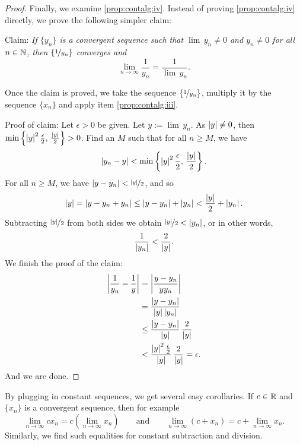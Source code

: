 \begin{proof}
Finally, we examine
\ref{prop:contalg:iv}.  Instead of proving 
\ref{prop:contalg:iv} directly, we prove the following simpler claim:

Claim: \emph{If $\{ y_n \}$ is a convergent sequence such that
$\lim\, y_n \not= 0$ and $y_n \not= 0$ for all $n \in {\mathbb{N}}$, then
$\{ \nicefrac{1}{y_n} \}$ converges and}
\begin{equation*}
\lim_{n\to\infty} \frac{1}{y_n} = \frac{1}{\lim\, y_n}  .
\end{equation*}

Once the claim is proved, we take the sequence $\{ \nicefrac{1}{y_n} \}$,
multiply it by the sequence $\{ x_n \}$ and apply item
\ref{prop:contalg:iii}.

Proof of claim:  Let $\epsilon > 0$ be given.
Let $y := \lim\, y_n$.
As $\left\lvert {y} \right\rvert \not= 0$, then
$\min \left\{ \left\lvert {y} \right\rvert^2\frac{\epsilon}{2}, \, \frac{\left\lvert {y} \right\rvert}{2} \right\} > 0$.
Find an $M$ such that for all $n \geq M$,
we have
\begin{equation*}
\left\lvert {y_n - y} \right\rvert < \min \left\{ \left\lvert {y} \right\rvert^2\frac{\epsilon}{2}, \, \frac{\left\lvert {y} \right\rvert}{2}
\right\} .
\end{equation*}
For all $n \geq M$, we have
$\left\lvert {y - y_n} \right\rvert < \nicefrac{\left\lvert {y} \right\rvert}{2}$, and so
\begin{equation*}
\left\lvert {y} \right\rvert = 
\left\lvert {y - y_n + y_n } \right\rvert \leq
\left\lvert {y - y_n} \right\rvert + \left\lvert { y_n } \right\rvert < \frac{\left\lvert {y} \right\rvert}{2} + \left\lvert {y_n} \right\rvert.
\end{equation*}
Subtracting $\nicefrac{\left\lvert {y} \right\rvert}{2}$ from both sides we obtain
$\nicefrac{\left\lvert {y} \right\rvert}{2} < \left\lvert {y_n} \right\rvert$, or in other words,
\begin{equation*}
\frac{1}{\left\lvert {y_n} \right\rvert} < \frac{2}{\left\lvert {y} \right\rvert} .
\end{equation*}
We finish the proof of the claim:
\begin{equation*}
\begin{split}
\left\lvert {\frac{1}{y_n} - \frac{1}{y}} \right\rvert &=
\left\lvert {\frac{y - y_n}{y y_n}} \right\rvert \\
& =
\frac{\left\lvert {y - y_n} \right\rvert}{\left\lvert {y} \right\rvert \left\lvert {y_n} \right\rvert} \\
& \leq
\frac{\left\lvert {y - y_n} \right\rvert}{\left\lvert {y} \right\rvert} \, \frac{2}{\left\lvert {y} \right\rvert} \\
& <
\frac{\left\lvert {y} \right\rvert^2 \frac{\epsilon}{2}}{\left\lvert {y} \right\rvert} \, \frac{2}{\left\lvert {y} \right\rvert}
= \epsilon .
\end{split}
\end{equation*}
And we are done.
\end{proof}

By plugging in constant sequences, we get several easy corollaries.
If $c \in {\mathbb{R}}$ and $\{ x_n \}$ is a convergent sequence, then
for example
\begin{equation*}
\lim_{n \to \infty} c x_n = 
c \left( \lim_{n \to \infty} x_n \right) \qquad
\text{and}
\qquad
\lim_{n \to \infty} (c + x_n) = 
c + \lim_{n \to \infty} x_n .
\end{equation*}
Similarly, we find such equalities for constant subtraction and division.

